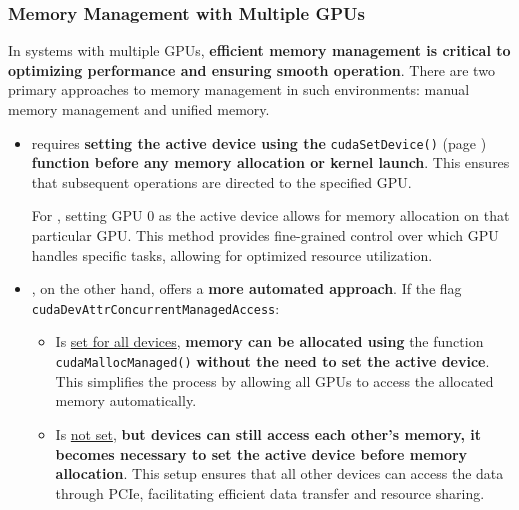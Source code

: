 \subsubsection{Memory Management with Multiple GPUs}

In systems with multiple GPUs, \textbf{efficient memory management is critical to optimizing performance and ensuring smooth operation}. There are two primary approaches to memory management in such environments: manual memory management and unified memory.
\begin{itemize}
  \item {} requires \textbf{setting the active device using the} \texttt{cudaSetDevice()} (page \pageref{code: cudaSetDevice}) \textbf{function before any memory allocation or kernel launch}. This ensures that subsequent operations are directed to the specified GPU.
  
  For , setting GPU 0 as the active device allows for memory allocation on that particular GPU. This method provides fine-grained control over which GPU handles specific tasks, allowing for optimized resource utilization.

  \item {}, on the other hand, offers a \textbf{more automated approach}. If the flag \texttt{cudaDevAttrConcurrentManagedAccess}:
  \begin{itemize}
    \item Is \underline{set for all devices}, \textbf{memory can be allocated using} the function \texttt{cudaMallocManaged()} \textbf{without the need to set the active device}. This simplifies the process by allowing all GPUs to access the allocated memory automatically.

    \item Is \underline{not set}, \textbf{but devices can still access each other's memory, it becomes necessary to set the active device before memory allocation}. This setup ensures that all other devices can access the data through PCIe, facilitating efficient data transfer and resource sharing.
  \end{itemize}
\end{itemize}

